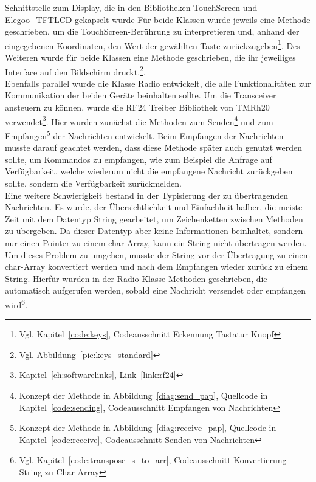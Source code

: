 \documentclass[a4paper, 11pt]{scrartcl}
\begin{document}
Schnittstelle zum Display, die in den Bibliotheken \glqq TouchScreen\grqq{} und \glqq Elegoo\_TFTLCD\grqq{} gekapselt wurde%
Für beide Klassen wurde jeweils eine Methode geschrieben, um die TouchScreen-Berührung zu interpretieren und, anhand der eingegebenen Koordinaten, den Wert der gewählten Taste
zurückzugeben\footnote{Vgl. Kapitel~\ref{code:keys}, Codeausschnitt \glqq Erkennung Tastatur Knopf\grqq{}}.
Des Weiteren wurde für beide Klassen eine Methode geschrieben, die ihr jeweiliges Interface auf den Bildschirm druckt.\footnote{Vgl. Abbildung~\ref{pic:keys_standard}}.
\\
Ebenfalls parallel wurde die Klasse \glqq Radio\grqq{} entwickelt, die alle Funktionalitäten zur Kommunikation der beiden Geräte beinhalten sollte. Um die Transceiver 
ansteuern zu können, wurde die RF24 Treiber Bibliothek von TMRh20 verwendet\footnote{Kapitel~\ref{ch:softwarelinks}, Link~\ref{link:rf24}}. Hier wurden zunächst die 
Methoden zum Senden\footnote{Konzept der Methode in Abbildung~\ref{diag:send_pap}, Quellcode in Kapitel~\ref{code:sending}, Codeausschnitt \glqq Empfangen von Nachrichten\grqq{}} 
und zum Empfangen\footnote{Konzept der Methode in Abbildung~\ref{diag:receive_pap}, Quellcode in Kapitel~\ref{code:receive}, Codeausschnitt \glqq Senden von Nachrichten\grqq{}}
der Nachrichten entwickelt. Beim Empfangen der Nachrichten musste darauf geachtet werden, dass diese Methode später auch genutzt werden sollte, um Kommandos zu empfangen,
wie zum Beispiel die Anfrage auf Verfügbarkeit, welche wiederum nicht die empfangene Nachricht zurückgeben sollte, sondern die Verfügbarkeit zurückmelden.
\\
Eine weitere Schwierigkeit bestand in der Typisierung der zu übertragenden Nachrichten. Es wurde, der Übersichtlichkeit und Einfachheit halber, die meiste Zeit mit
dem Datentyp String gearbeitet, um Zeichenketten zwischen Methoden zu übergeben. Da dieser Datentyp aber keine Informationen beinhaltet, sondern nur einen Pointer
zu einem char-Array, kann ein String nicht übertragen werden. Um dieses Problem zu umgehen, musste der String vor der Übertragung zu einem char-Array konvertiert
werden und nach dem Empfangen wieder zurück zu einem String. Hierfür wurden in der Radio-Klasse Methoden geschrieben, die automatisch aufgerufen werden, sobald
eine Nachricht versendet oder empfangen wird\footnote{Vgl. Kapitel~\ref{code:transpose_s_to_arr}, Codeausschnitt \glqq Konvertierung String zu Char-Array\grqq{}}.
\end{document}
